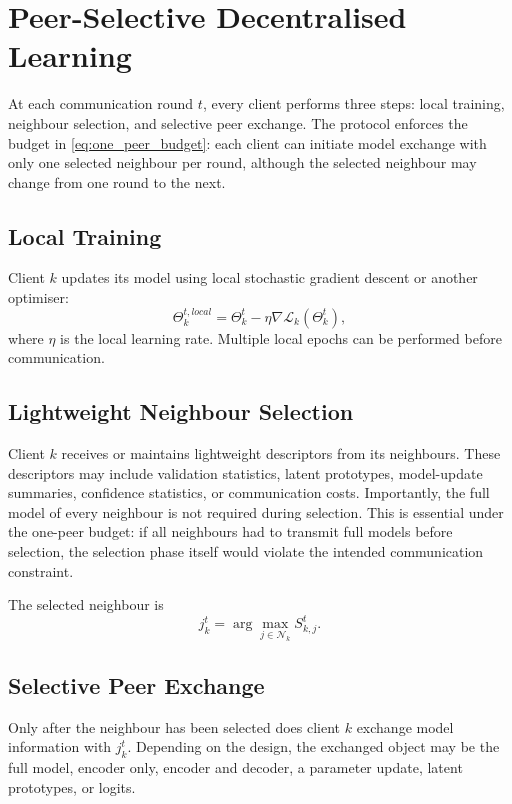 \documentclass[conference]{IEEEtran}
\begin{document}
\section{Peer-Selective Decentralised Learning}
\label{sec:peer-selective-decentralised-training-protocol}

At each communication round \(t\), every client performs three steps: local training, neighbour selection, and selective peer exchange. The protocol enforces the budget in \eqref{eq:one_peer_budget}: each client can initiate model exchange with only one selected neighbour per round, although the selected neighbour may change from one round to the next.

\subsection{Local Training}
\label{subsec:local-training}
Client \(k\) updates its model using local stochastic gradient descent or another optimiser:
\begin{equation}
    \Theta_k^{t,local} = \Theta_k^t - \eta \nabla \mathcal{L}_k(\Theta_k^t),
    \label{eq:auto-014}
\end{equation}
where \(\eta\) is the local learning rate. Multiple local epochs can be performed before communication.

\subsection{Lightweight Neighbour Selection}
\label{subsec:lightweight-neighbour-selection}
Client \(k\) receives or maintains lightweight descriptors from its neighbours. These descriptors may include validation statistics, latent prototypes, model-update summaries, confidence statistics, or communication costs. Importantly, the full model of every neighbour is not required during selection. This is essential under the one-peer budget: if all neighbours had to transmit full models before selection, the selection phase itself would violate the intended communication constraint.

The selected neighbour is
\begin{equation}
    j_k^t = \arg\max_{j\in\mathcal{N}_k} S_{k,j}^{t}.
    \label{eq:auto-015}
\end{equation}

\subsection{Selective Peer Exchange}
\label{subsec:selective-peer-exchange}
Only after the neighbour has been selected does client \(k\) exchange model information with \(j_k^t\). Depending on the design, the exchanged object may be the full model, encoder only, encoder and decoder, a parameter update, latent prototypes, or logits.
\end{document}
